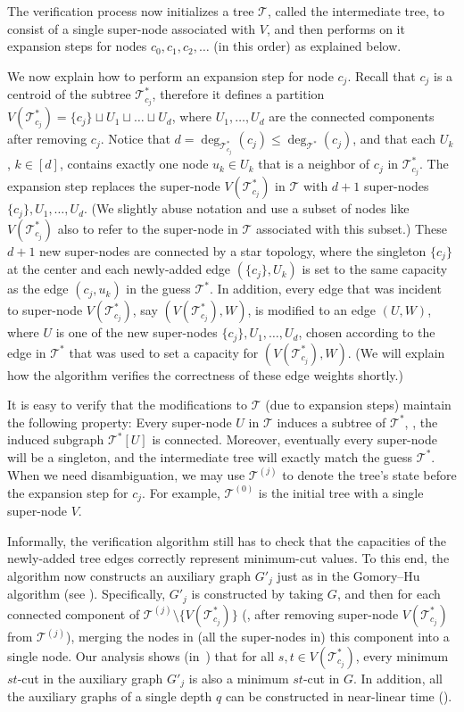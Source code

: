 \documentclass{toc}
\theoremstyle{plain}
\newcommand{\T}{\mathcal{T}}
\newcommand{\TG}{\mathcal{T}^*}
\providecommand{\set}[1]{{\{#1\}}}
\begin{document}
The verification process now initializes a tree $\T$,
called the intermediate tree,
to consist of a single super-node associated with $V$,
and then performs on it expansion steps for nodes $c_0,c_1,c_2,\ldots$
(in this order) as explained below.

We now explain how to perform an expansion step for node $c_j$.
Recall that $c_j$ is a centroid of the subtree $\TG_{c_j}$,
therefore it defines a partition
$V(\TG_{c_j}) = \set{c_j}\sqcup U_1 \sqcup\dots\sqcup U_d$,
where $U_1,\ldots,U_d$ are the connected components after removing $c_j$.
Notice that $d = \deg_{\TG_{c_j}}(c_j)\leq \deg_{\TG}(c_j)$,
and that each $U_k$, $k\in [d]$, contains exactly one node $u_k\in U_k$
that is a neighbor of $c_j$ in $\TG_{c_j}$.
The expansion step replaces the super-node $V(\TG_{c_j})$ in $\T$
with $d+1$ super-nodes $\set{c_j},U_1,\dots,U_d$.
(We slightly abuse notation and use a subset of nodes like $V(\TG_{c_j})$
also to refer to the super-node in $\T$ associated with this subset.)
%
These $d+1$ new super-nodes are connected by a star topology,
where the singleton $\set{c_j}$ at the center
and each newly-added edge $(\set{c_j}, U_k)$
is set to the same capacity as the edge $(c_j, u_k)$ in the guess $\TG$.
In addition, every edge that was incident to super-node $V(\TG_{c_j})$,
say $(V(\TG_{c_j}),W)$, is modified to an edge $(U,W)$,
where $U$ is one of the new super-nodes $\set{c_j},U_1,\dots,U_d$,
chosen according to the edge in $\TG$ that was used to set
a capacity for $(V(\TG_{c_j}),W)$.
(We will explain how the algorithm verifies the correctness of these edge weights shortly.)

It is easy to verify that the modifications to $\T$ (due to expansion steps)
maintain the following property:
Every super-node $U$ in $\T$ induces a subtree of $\TG$,
\ie, the induced subgraph $\TG[U]$ is connected.
Moreover, eventually every super-node will be a singleton,
and the intermediate tree will exactly match the guess $\TG$.
When we need disambiguation, we may use $\T^{(j)}$
to denote the tree's state before the expansion step for $c_j$.
For example, $\T^{(0)}$ is the initial tree with a single super-node $V$.


Informally, the verification algorithm still has to check that the capacities
of the newly-added tree edges correctly represent minimum-cut values.
To this end, the algorithm now constructs an auxiliary graph $G'_j$
just as in the Gomory--Hu algorithm (see ).
Specifically, $G'_j$ is constructed by taking $G$,
and then for each connected component of $\T^{(j)}\setminus \set{V(\TG_{c_j})}$
(\ie, after removing super-node $V(\TG_{c_j})$ from $\T^{(j)}$),
merging the nodes in (all the super-nodes in) this component into a single node.
%
Our analysis shows (in~)
that for all $s,t\in V(\TG_{c_j})$,
every minimum $st$-cut in the auxiliary graph $G'_j$
is also a minimum $st$-cut in $G$.
In addition, all the auxiliary graphs of a single depth $q$
can be constructed in near-linear time ().
\end{document}
